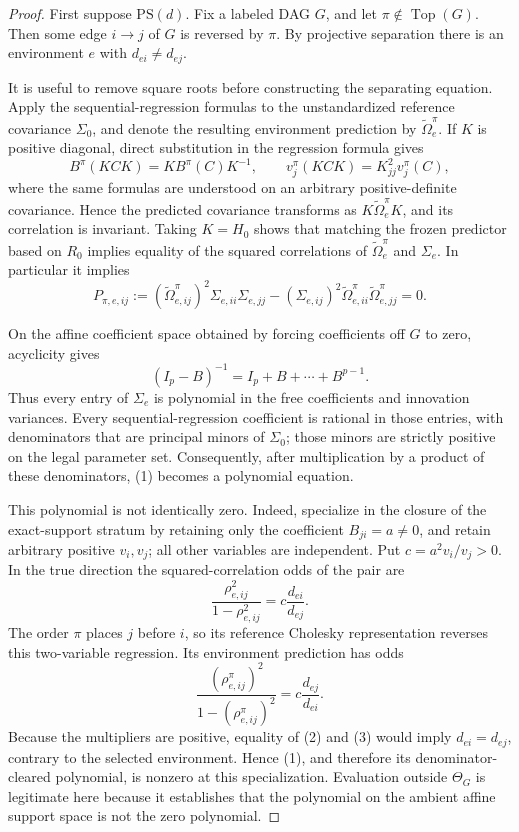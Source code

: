 \documentclass{article}
\begin{document}
\begin{proof}
First suppose \(\mathrm{PS}(d)\).  Fix a labeled DAG \(G\), and let \(\pi\notin\operatorname{Top}(G)\).  Then some edge \(i\to j\) of \(G\) is reversed by \(\pi\).  By projective separation there is an environment \(e\) with \(d_{ei}\ne d_{ej}\).

It is useful to remove square roots before constructing the separating equation.  Apply the sequential-regression formulas to the unstandardized reference covariance \(\Sigma_0\), and denote the resulting environment prediction by \(\widetilde\Omega_e^\pi\).  If \(K\) is positive diagonal, direct substitution in the regression formula gives
\[
 B^\pi(KCK) = KB^\pi(C)K^{-1},\qquad
 v_j^\pi(KCK)=K_{jj}^2v_j^\pi(C),
\]
where the same formulas are understood on an arbitrary positive-definite covariance.  Hence the predicted covariance transforms as \(K\widetilde\Omega_e^\pi K\), and its correlation is invariant.  Taking \(K=H_0\) shows that matching the frozen predictor based on \(R_0\) implies equality of the squared correlations of \(\widetilde\Omega_e^\pi\) and \(\Sigma_e\).  In particular it implies
\[
 P_{\pi,e,ij}:=
 (\widetilde\Omega_{e,ij}^\pi)^2\Sigma_{e,ii}\Sigma_{e,jj}
 -(\Sigma_{e,ij})^2\widetilde\Omega_{e,ii}^\pi
 \widetilde\Omega_{e,jj}^\pi=0. \tag{1}
\]

On the affine coefficient space obtained by forcing coefficients off \(G\) to zero, acyclicity gives
\[
 (I_p-B)^{-1}=I_p+B+\cdots+B^{p-1}.
\]
Thus every entry of \(\Sigma_e\) is polynomial in the free coefficients and innovation variances.  Every sequential-regression coefficient is rational in those entries, with denominators that are principal minors of \(\Sigma_0\); those minors are strictly positive on the legal parameter set.  Consequently, after multiplication by a product of these denominators, (1) becomes a polynomial equation.

This polynomial is not identically zero.  Indeed, specialize in the closure of the exact-support stratum by retaining only the coefficient \(B_{ji}=a\ne0\), and retain arbitrary positive \(v_i,v_j\); all other variables are independent.  Put \(c=a^2v_i/v_j>0\).  In the true direction the squared-correlation odds of the pair are
\[
 \frac{\rho_{e,ij}^2}{1-\rho_{e,ij}^2}
 =c\frac{d_{ei}}{d_{ej}}. \tag{2}
\]
The order \(\pi\) places \(j\) before \(i\), so its reference Cholesky representation reverses this two-variable regression.  Its environment prediction has odds
\[
 \frac{(\rho_{e,ij}^{\pi})^2}{1-(\rho_{e,ij}^{\pi})^2}
 =c\frac{d_{ej}}{d_{ei}}. \tag{3}
\]
Because the multipliers are positive, equality of (2) and (3) would imply \(d_{ei}=d_{ej}\), contrary to the selected environment.  Hence (1), and therefore its denominator-cleared polynomial, is nonzero at this specialization.  Evaluation outside \(\Theta_G\) is legitimate here because it establishes that the polynomial on the ambient affine support space is not the zero polynomial.


\end{proof}
\end{document}
